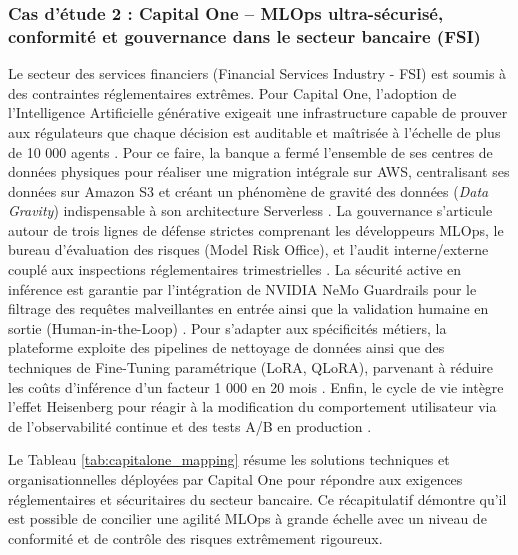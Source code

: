 \subsubsection{Cas d'étude 2 : Capital One -- MLOps ultra-sécurisé, conformité et gouvernance dans le secteur bancaire (FSI)}
Le secteur des services financiers (Financial Services Industry - FSI) est soumis à des contraintes réglementaires extrêmes. Pour Capital One, l'adoption de l'Intelligence Artificielle générative exigeait une infrastructure capable de prouver aux régulateurs que chaque décision est auditable et maîtrisée à l'échelle de plus de 10 000 agents \cite{77}. Pour ce faire, la banque a fermé l'ensemble de ses centres de données physiques pour réaliser une migration intégrale sur AWS, centralisant ses données sur Amazon S3 et créant un phénomène de gravité des données (\textit{Data Gravity}) indispensable à son architecture Serverless \cite{77}. La gouvernance s'articule autour de trois lignes de défense strictes comprenant les développeurs MLOps, le bureau d'évaluation des risques (Model Risk Office), et l'audit interne/externe couplé aux inspections réglementaires trimestrielles \cite{77}. La sécurité active en inférence est garantie par l'intégration de NVIDIA NeMo Guardrails pour le filtrage des requêtes malveillantes en entrée ainsi que la validation humaine en sortie (Human-in-the-Loop) \cite{77}. Pour s'adapter aux spécificités métiers, la plateforme exploite des pipelines de nettoyage de données ainsi que des techniques de Fine-Tuning paramétrique (LoRA, QLoRA), parvenant à réduire les coûts d'inférence d'un facteur 1 000 en 20 mois \cite{77}. Enfin, le cycle de vie intègre l'effet Heisenberg pour réagir à la modification du comportement utilisateur via de l'observabilité continue et des tests A/B en production \cite{77}.

Le Tableau \ref{tab:capitalone_mapping} résume les solutions techniques et organisationnelles déployées par Capital One pour répondre aux exigences réglementaires et sécuritaires du secteur bancaire. Ce récapitulatif démontre qu'il est possible de concilier une agilité MLOps à grande échelle avec un niveau de conformité et de contrôle des risques extrêmement rigoureux.

